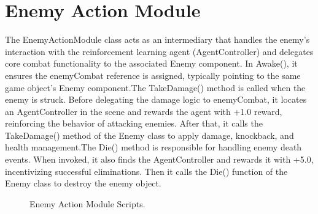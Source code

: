 \documentclass[12pt,oneside,openright,a4paper]{cpe-english-project}
\begin{document}
\section{Enemy Action Module}
The EnemyActionModule class acts as an intermediary that handles the enemy's interaction with the reinforcement learning agent (AgentController) and delegates core combat functionality to the associated Enemy component. In Awake(), it ensures the enemyCombat reference is assigned, typically pointing to the same game object’s Enemy component.The TakeDamage() method is called when the enemy is struck. Before delegating the damage logic to enemyCombat, it locates an AgentController in the scene and rewards the agent with +1.0 reward, reinforcing the behavior of attacking enemies. After that, it calls the TakeDamage() method of the Enemy class to apply damage, knockback, and health management.The Die() method is responsible for handling enemy death events. When invoked, it also finds the AgentController and rewards it with +5.0, incentivizing successful eliminations. Then it calls the Die() function of the Enemy class to destroy the enemy object.\par
 \begin{figure}[!h]
 \centering
\caption{Enemy Action Module Scripts.}\label{fig:Enemyactionmodule}
\end{figure}
\newpage
\end{document}
